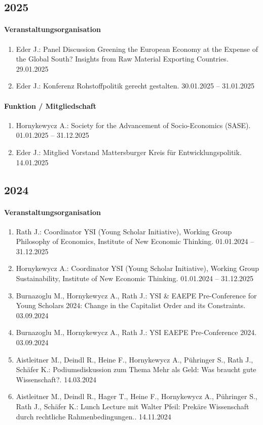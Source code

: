 
\subsection*{2025}
\paragraph{Veranstaltungsorganisation}
\begin{enumerate}[leftmargin=*, labelsep=0.5cm]
\item Eder J.: Panel Discussion \glqq Greening the European Economy at the Expense of the Global South? Insights from Raw Material Exporting Countries\grqq{}. 29.01.2025
\item Eder J.: Konferenz \glqq Rohstoffpolitik gerecht gestalten\grqq{}. 30.01.2025 -- 31.01.2025
\end{enumerate}

\paragraph{Funktion / Mitgliedschaft}
\begin{enumerate}[leftmargin=*, labelsep=0.5cm]
\item Hornykewycz A.: Society for the Advancement of Socio-Economics (SASE). 01.01.2025 -- 31.12.2025
\item Eder J.: Mitglied Vorstand Mattersburger Kreis für Entwicklungspolitik. 14.01.2025
\end{enumerate}
\subsection*{2024}
\paragraph{Veranstaltungsorganisation}
\begin{enumerate}[leftmargin=*, labelsep=0.5cm]
\item Rath J.: Coordinator YSI (Young Scholar Initiative), Working Group Philosophy of Economics,  Institute of New Economic Thinking. 01.01.2024 -- 31.12.2025
\item Hornykewycz A.: Coordinator YSI (Young Scholar Initiative), Working Group Sustainability, Institute of New Economic Thinking. 01.01.2024 -- 31.12.2025
\item Burnazoglu M., Hornykewycz A., Rath J.: YSI \& EAEPE Pre-Conference for Young Scholars 2024: Change in the Capitalist Order and its Constraints. 03.09.2024
\item Burnazoglu M., Hornykewycz A., Rath J.: YSI EAEPE Pre-Conference 2024. 03.09.2024
\item Aistleitner M., Deindl R., Heine F., Hornykewycz A., Pühringer S., Rath J., Schäfer K.: Podiumsdiskussion zum Thema \glqq Mehr als Geld: Was braucht gute Wissenschaft?\grqq{}. 14.03.2024
\item Aistleitner M., Deindl R., Hager T., Heine F., Hornykewycz A., Pühringer S., Rath J., Schäfer K.: Lunch Lecture mit Walter Pfeil: Prekäre Wissenschaft durch rechtliche Rahmenbedingungen.. 14.11.2024
\end{enumerate}

